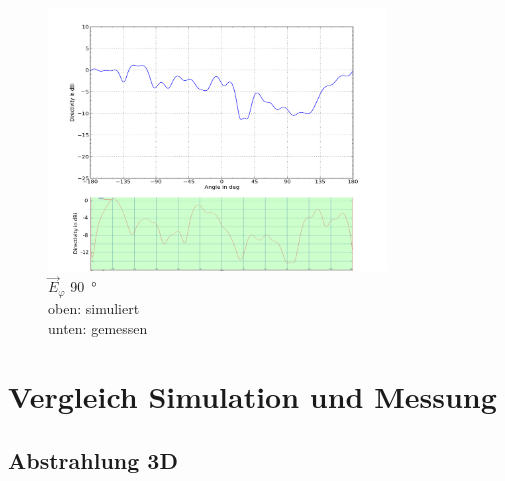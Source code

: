 \begin{figure}[h!]
	\centering
	\includegraphics[width=0.8\textwidth]{../fig/plt/comparison_l4_pcb_v2c_laptop_1a_105_etot_phi90_2ghz4.png}
	\caption{$\vec{E}_{\varphi}$ \;\; \SI{90}{\degree} \\
		\hspace*{107pt}oben: simuliert\\
		\hspace*{115pt}unten: gemessen}
	\label{fig:E_tot_90}
\end{figure}

\clearpage
\section{Vergleich Simulation und Messung}

\subsection{Abstrahlung 3D}

